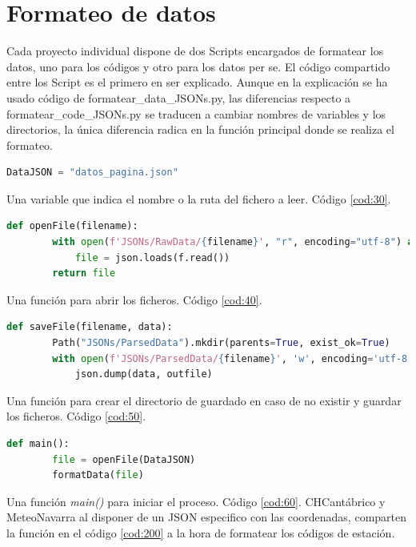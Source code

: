 \section{Formateo de datos}
Cada proyecto individual dispone de dos Scripts encargados de formatear los datos, uno para los códigos y otro para los datos per se.\newline
\newline
El código compartido entre los Script es el primero en ser explicado. Aunque en la explicación se ha usado código de formatear\_data\_JSONs.py, las diferencias respecto a formatear\_code\_JSONs.py se traducen a cambiar nombres de variables y los directorios, la única diferencia radica en la función principal donde se realiza el formateo.

\begin{lstlisting}[language=Python, caption={Declaración variable del JSON que se desea usar}, label=cod:30]
	DataJSON = "datos_pagina.json"
\end{lstlisting}

Una variable que indica el nombre o la ruta del fichero a leer. Código \ref{cod:30}.

\begin{lstlisting}[language=Python, caption={Declaración función \textit{openFile()}}, label=cod:40]
	def openFile(filename):
		with open(f'JSONs/RawData/{filename}', "r", encoding="utf-8") as f:
			file = json.loads(f.read())
		return file
\end{lstlisting}

Una función para abrir los ficheros. Código \ref{cod:40}.

\begin{lstlisting}[language=Python, caption={Declaración función \textit{saveFile()}}, label=cod:50]
	def saveFile(filename, data):
		Path("JSONs/ParsedData").mkdir(parents=True, exist_ok=True)
		with open(f'JSONs/ParsedData/{filename}', 'w', encoding='utf-8') as outfile:
			json.dump(data, outfile)
\end{lstlisting}

Una función para crear el directorio de guardado en caso de no existir y guardar los ficheros. Código \ref{cod:50}.

\begin{lstlisting}[language=Python, caption={Declaración función \textit{main()}}, label=cod:60]
	def main():
		file = openFile(DataJSON)
		formatData(file)
\end{lstlisting}

Una función \textit{main()} para iniciar el proceso. Código \ref{cod:60}.\newline
\newline
CHCantábrico y MeteoNavarra al disponer de un JSON especifico con las coordenadas, comparten la función en el código \ref{cod:200} a la hora de formatear los códigos de estación.

